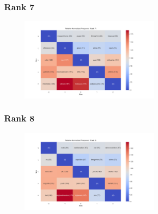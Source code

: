 \documentclass[11pt]{article}
\begin{document}
\subsubsection{Rank 7}
\begin{center}


\resizebox{\columnwidth}{!}
{
\TTRNFTable
}
\begin{figure}[h!]
  \includegraphics[width=0.6\textwidth]{figs/top_ten_rnf/rnf_w_rank_7.png}
\end{figure}
\end{center}

\pagebreak

\subsubsection{Rank 8}
\begin{center}


\resizebox{\columnwidth}{!}
{
\TTRNFTable
}
\begin{figure}[h!]
  \includegraphics[width=0.6\textwidth]{figs/top_ten_rnf/rnf_w_rank_8.png}
\end{figure}
\end{center}
\end{document}
